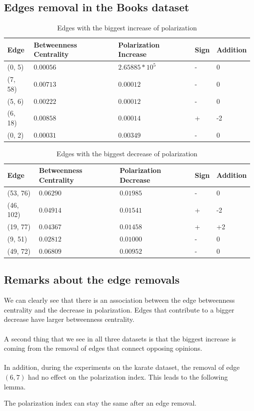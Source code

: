 \subsection{Edges removal in the Books dataset}
\begin{table}[H]
 \centering
 \caption{Edges with the biggest increase of polarization }
 \label{tab:edgesLargest}
 \begin{tabular}{| l || l | l | l | l |}
 \hline
  Edge & Betweenness Centrality & Polarization Increase & Sign & Addition\\
  \hline
  \hline
  (0, 5) & $0.00056$ & $2.65885*10^5$ & - &  0\\
  \hline
  (7, 58) & $0.00713$ & $0.00012$ & - &  0\\
  \hline
  (5, 6) & $0.00222$ & $0.00012$ & - &  0\\
  \hline
  (6, 18) & $0.00858$ & $0.00014$ & +& -2\\
  \hline
  (0, 2) & $0.00031$ & $0.00349$ & - &  0\\
  \hline
 \end{tabular}
\end{table}

\begin{table}[H]
 \centering
 \caption{Edges with the biggest decrease of polarization}
 \label{tab:edgesLargest}
 \begin{tabular}{| l || l | l | l | l |}
 \hline
  Edge & Betweenness Centrality & Polarization Decrease & Sign & Addition\\
  \hline
  \hline
  (53, 76) & $0.06290$ & $0.01985$ & - &  0\\
  \hline
  (46, 102) & $0.04914$ & $0.01541$ & + &  -2\\
  \hline
  (19, 77) & $0.04367$ & $0.01458$ & + &  +2\\
  \hline
  (9, 51) & $0.02812$ & $0.01000$ & - &  0\\
  \hline
  (49, 72) & $0.06809$ & $0.00952$ & - &  0\\
  \hline
 \end{tabular} 
\end{table}

\subsection{Remarks about the edge removals}

We can clearly see that there is an association between the edge betweenness centrality and the decrease in polarization. Edges that contribute to a bigger decrease have larger betweenness centrality. 
\\
\\
A second thing that we see in all three datasets is that the biggest increase is coming from the removal of edges that connect opposing opinions.
\\
\\
In addition, during the experiments on the karate dataset, the removal of edge $(6, 7)$ had no effect on the polarization index. This leads to the following lemma.

\begin{lemma}
The polarization index can stay the same after an edge removal.
\end{lemma}

